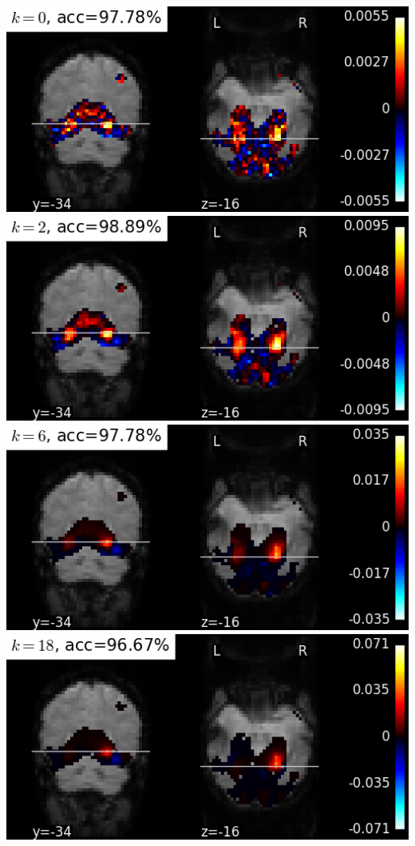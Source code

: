\begin{marginfigure}
\includegraphics[width=1\linewidth]{figures/haxby_igraphnet_w_0_yz.png}
\includegraphics[width=1\linewidth]{figures/haxby_igraphnet_w_2_yz.png}
\includegraphics[width=1\linewidth]{figures/haxby_igraphnet_w_6_yz.png}
\includegraphics[width=1\linewidth]{figures/haxby_igraphnet_w_18_yz.png}

\end{marginfigure}
